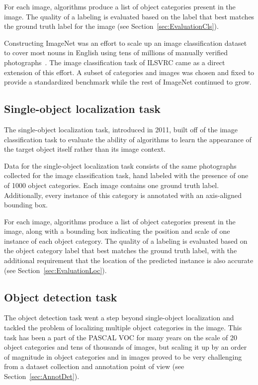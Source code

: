 For each image, algorithms  produce a list of object categories present in the image. The quality of a labeling is evaluated based on the label that best matches the ground truth label for the image (see Section~\ref{sec:EvaluationCls}).

Constructing ImageNet was an effort to scale up an image classification dataset to cover most nouns in English using tens of millions of manually verified photographs~\citep{ImageNet}. The image classification task of ILSVRC came as a direct extension of this effort. A subset of categories and images was chosen and fixed to provide a standardized benchmark while the rest of ImageNet continued to grow. 

\subsection{Single-object localization task}
\label{sec:TasksLoc}

The single-object localization task, introduced in 2011, built off of the image classification task to evaluate the ability of algorithms to learn the appearance of the target object itself rather than its image context.

Data for the single-object localization task consists of the same photographs collected for the image classification task, hand
labeled with the presence of one of 1000 object categories.  Each image contains one ground truth label. Additionally, 
every instance of this category is annotated with an axis-aligned bounding box.

For each image, algorithms produce a list of object categories present in the image, along with a bounding box  
 indicating the position and scale of one instance of each object category. The quality of a labeling is evaluated based on
the object category label that best matches the ground truth label, with the additional requirement that the location of the predicted instance is also accurate (see Section~\ref{sec:EvaluationLoc}).

\subsection{Object detection task}
\label{sec:TasksDet}

The object detection task went a step beyond single-object localization and tackled the problem of localizing multiple object categories in the image. This task has been a part of the PASCAL VOC for many years on the scale of 20 object categories and tens of thousands of images, but scaling it up by an order of magnitude in object categories and in images proved to be very challenging from a dataset collection and annotation point of view (see Section~\ref{sec:AnnotDet}). 


